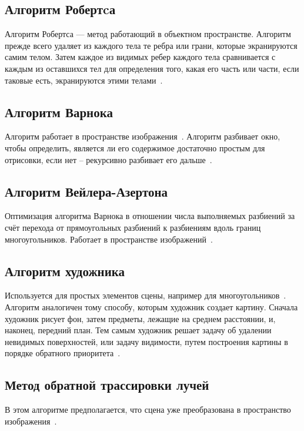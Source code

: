 \subsection{Алгоритм Робертcа}

Алгоритм Робертса — метод работающий в объектном пространстве. Алгоритм прежде всего удаляет из каждого тела те ребра или грани, которые экранируются самим телом. Затем каждое из видимых ребер каждого тела сравнивается с каждым из оставшихся тел для определения того, какая его часть или части, если таковые есть, экранируются этими телами~\cite{rodgers1989algorithms}. 

\subsection{Алгоритм Варнока}

Алгоритм работает в пространстве изображения~\cite{rodgers1989algorithms}. Алгоритм разбивает окно, чтобы определить, является ли его содержимое достаточно простым для отрисовки, если нет -- рекурсивно разбивает его дальше~\cite{rodgers1989algorithms}.


\subsection{Алгоритм Вейлера-Азертона}

Оптимизация алгоритма Варнока в отношении числа выполняемых разбиений за счёт перехода от прямоугольных разбиений к разбиениям вдоль границ многоугольников. Работает в пространстве изображений~\cite{rodgers1989algorithms}.

\subsection{Алгоритм художника}

Используется для простых элементов сцены, например для многоугольников~\cite{rodgers1989algorithms}. Алгоритм аналогичен тому способу, которым художник создает картину. Сначала художник рисует фон, затем предметы, лежащие на среднем расстоянии, и, наконец, передний план. Тем самым художник решает задачу об удалении невидимых поверхностей, или задачу видимости, путем построения картины в порядке обратного приоритета~\cite{rodgers1989algorithms}.

\subsection{Метод обратной трассировки лучей}
В этом алгоритме предполагается, что сцена уже преобразована в пространство изображения~\cite{rodgers1989algorithms}. 

